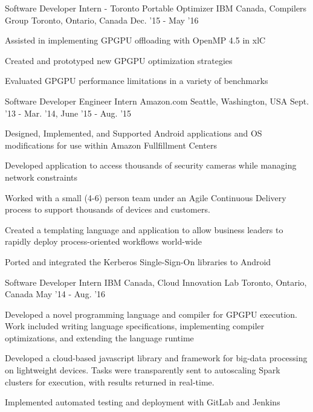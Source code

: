 \begin{cventries}
\cventry
    {Software Developer Intern - Toronto Portable Optimizer} %
    {IBM Canada, Compilers Group} %
    {Toronto, Ontario, Canada} %
    {Dec. '15 - May '16} %
    {
        \begin{cvitems}
            \item Assisted in implementing GPGPU offloading with OpenMP 4.5 in xlC
            \item Created and prototyped new GPGPU optimization strategies
            \item Evaluated GPGPU performance limitations in a variety of benchmarks
        \end{cvitems}
    }
\cventry
    {Software Developer Engineer Intern} %
    {Amazon.com} %
    {Seattle, Washington, USA} %
    {Sept. '13 - Mar. '14,
    June '15 - Aug. '15} %
    {
        \begin{cvitems}
            \item Designed, Implemented, and Supported Android applications and OS modifications for use within Amazon Fullfillment Centers
            \item Developed application to access thousands of security cameras while managing network constraints
            \item Worked with a small (4-6) person team under an Agile Continuous Delivery process to support thousands of devices and customers.
            \item Created a templating language and application to allow business leaders to rapidly deploy process-oriented workflows world-wide
            \item Ported and integrated the Kerberos Single-Sign-On libraries to Android
        \end{cvitems}
    }
\cventry
    {Software Developer Intern} %
    {IBM Canada, Cloud Innovation Lab} %
    {Toronto, Ontario, Canada} %
    {May '14 - Aug. '16} %
    {
        \begin{cvitems}
            \item Developed a novel programming language and compiler for GPGPU execution. Work included writing language specifications, implementing compiler optimizations, and extending the language runtime
            \item Developed a cloud-based javascript library and framework for big-data processing on lightweight devices. Tasks were transparently sent to autoscaling Spark clusters for execution, with results returned in real-time.
            \item Implemented automated testing and deployment with GitLab and Jenkins
        \end{cvitems}
    }
\end{cventries}
